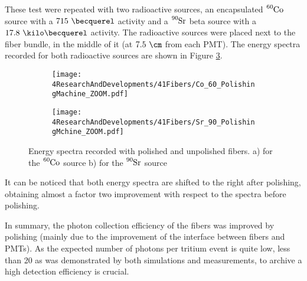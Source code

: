 These test were repeated with two radioactive sources, an encapsulated $\ce{^{60}Co}$ source with a $715~\becquerel$ activity and a $\ce{^{90}Sr}$ beta source with a $17.8~\kilo\becquerel$ activity. The radioactive sources were placed next to the fiber bundle, in the middle of it (at $7.5~\cm$ from each PMT). The energy spectra recorded for both radioactive sources are shown in Figure \ref{fig:ResultsOfPolishingMachineSources}.
\begin{figure}
\centering
    \begin{subfigure}[b]{1\textwidth}
    \centering
    \texttt{[image: 4ResearchAndDevelopments/41Fibers/Co\_60\_PolishingMachine\_ZOOM.pdf]}  
    \caption{\label{subfig:EnergySpectrumCo60PolishingTest}}
    \end{subfigure}
    \hfill
    \begin{subfigure}[b]{1\textwidth}
    \centering
    \texttt{[image: 4ResearchAndDevelopments/41Fibers/Sr\_90\_PolishingMchine\_ZOOM.pdf]}  
    \caption{\label{subfig:EnergySpectrumSr90PolishingTest}}
    \end{subfigure}
 \caption{Energy spectra recorded with polished and unpolished fibers. a) for the $\ce{^{60}Co}$ source b) for the $\ce{^{90}Sr}$ source}
 \label{fig:ResultsOfPolishingMachineSources}
\end{figure}
It can be noticed that both energy spectra are shifted to the right after polishing, obtaining almost a factor two improvement with respect to the spectra before polishing. 

In summary, the photon collection efficiency of the fibers was improved by polishing (mainly due to the improvement of the interface between fibers and PMTs). As the expected number of photons per tritium event is quite low, less than 20 as was demonstrated by both simulations and measurements, to archive a high detection efficiency is crucial.